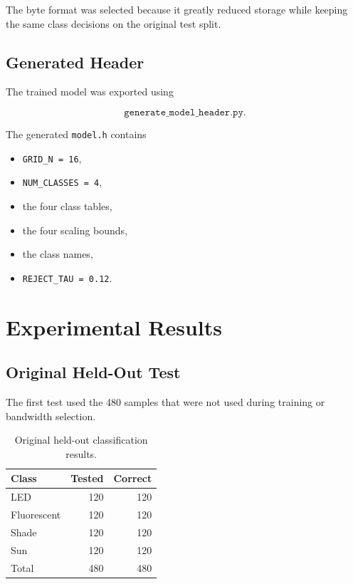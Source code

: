 \documentclass[10pt,a4paper,twocolumn]{article}
\begin{document}
The byte format was selected because it greatly reduced storage while keeping
the same class decisions on the original test split.


\subsection{Generated Header}

The trained model was exported using

\[
\texttt{generate\_model\_header.py}.
\]

The generated \texttt{model.h} contains

\begin{itemize}
    \item \texttt{GRID\_N = 16},
    \item \texttt{NUM\_CLASSES = 4},
    \item the four class tables,
    \item the four scaling bounds,
    \item the class names,
    \item \texttt{REJECT\_TAU = 0.12}.
\end{itemize}


\section{Experimental Results}

\subsection{Original Held-Out Test}

The first test used the 480 samples that were not used during training or
bandwidth selection.

\begin{table}[H]
\centering
\caption{Original held-out classification results.}
\label{tab:test}
\begin{tabular}{lrr}
\toprule
Class & Tested & Correct \\
\midrule
LED & 120 & 120 \\
Fluorescent & 120 & 120 \\
Shade & 120 & 120 \\
Sun & 120 & 120 \\
\midrule
Total & 480 & 480 \\
\bottomrule
\end{tabular}
\end{table}
\end{document}
